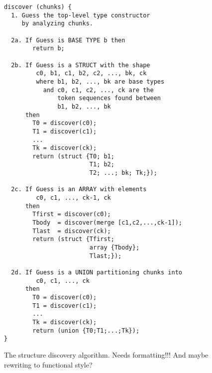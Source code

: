 \begin{figure}
\begin{verbatim}
discover (chunks) {
  1. Guess the top-level type constructor 
     by analyzing chunks.

  2a. If Guess is BASE TYPE b then  
        return b;

  2b. If Guess is a STRUCT with the shape 
         c0, b1, c1, b2, c2, ..., bk, ck 
         where b1, b2, ..., bk are base types
           and c0, c1, c2, ..., ck are the 
               token sequences found between 
               b1, b2, ..., bk   
      then
        T0 = discover(c0);
        T1 = discover(c1);
        ...
        Tk = discover(ck);
        return (struct {T0; b1; 
                        T1; b2; 
                        T2; ...; bk; Tk;});

  2c. If Guess is an ARRAY with elements
         c0, c1, ..., ck-1, ck
      then
        Tfirst = discover(c0);
        Tbody  = discover(merge [c1,c2,...,ck-1]);
        Tlast  = discover(ck);
        return (struct {Tfirst; 
                        array {Tbody}; 
                        Tlast;});

  2d. If Guess is a UNION partitioning chunks into 
         c0, c1, ..., ck
      then
        T0 = discover(c0);
        T1 = discover(c1);
        ...
        Tk = discover(ck);
        return (union {T0;T1;...;Tk});
}
\end{verbatim}
\caption{The structure discovery algorithm. Needs formatting!!!
         And maybe rewriting to functional style?}
\label{fig:structure-discovery}
\end{figure}
